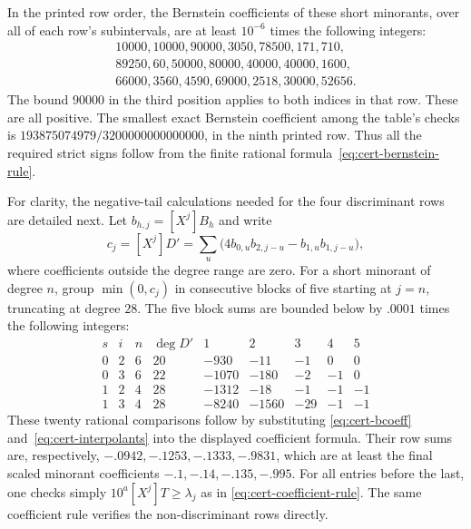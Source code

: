 In the printed row order, the Bernstein coefficients of these short
minorants, over all of each row's subintervals, are at least
$10^{-6}$ times the following integers:
\begin{equation}
\begin{gathered}
 10000, 10000, 90000, 3050, 78500, 171, 710,\\
 89250, 60, 50000, 80000, 40000, 40000, 1600,\\
 66000, 3560, 4590, 69000, 2518, 30000, 52656.
\end{gathered}
\label{eq:cert-third-bernstein-lower}
\end{equation}
The bound $90000$ in the third position applies to both indices in
that row.  These are all positive.  The smallest exact Bernstein
coefficient among the table's checks is
$193875074979/3200000000000000$, in the ninth printed row.
Thus all the required strict signs follow from the finite rational
formula~\eqref{eq:cert-bernstein-rule}.

For clarity, the negative-tail calculations needed for the four
discriminant rows are detailed next.  Let
$b_{h,j}=[X^j]B_h$ and write
\[
 c_j=[X^j]D'
     =\sum_u\bigl(4b_{0,u}b_{2,j-u}-b_{1,u}b_{1,j-u}\bigr),
\]
where coefficients outside the degree range are zero.  For a short
minorant of degree $n$, group $\min(0,c_j)$ in consecutive blocks
of five starting at $j=n$, truncating at degree $28$.  The five block
sums are bounded below by $.0001$ times the following integers:
\begin{equation}
\begin{array}{cc|c|c|rrrrr}
 s&i&n&\deg D'&1&2&3&4&5\\ \hline
 0&2&6&20&-930&-11&-1&0&0\\
 0&3&6&22&-1070&-180&-2&-1&0\\
 1&2&4&28&-1312&-18&-1&-1&-1\\
 1&3&4&28&-8240&-1560&-29&-1&-1
\end{array}
\label{eq:cert-tail-blocks}
\end{equation}
These twenty rational comparisons follow by substituting
\eqref{eq:cert-bcoeff} and~\eqref{eq:cert-interpolants} into the
displayed coefficient formula.  Their row sums are, respectively,
$-.0942,-.1253,-.1333,-.9831$, which are at least the final scaled
minorant coefficients $-.1,-.14,-.135,-.995$.
For all entries before the last, one checks simply
$10^a[X^j]T\ge\lambda_j$ as in
\eqref{eq:cert-coefficient-rule}.  The same coefficient rule verifies
the non-discriminant rows directly.

